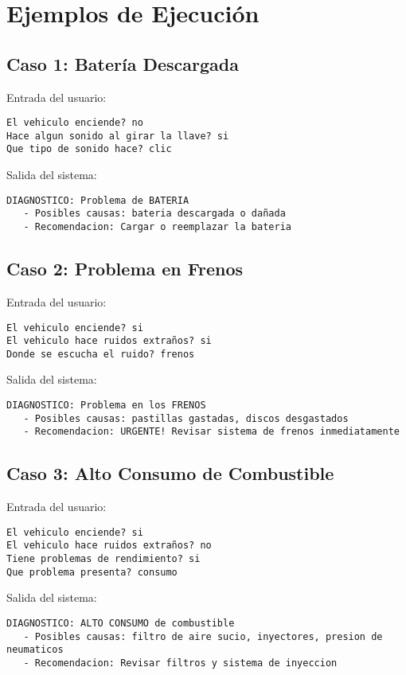 \documentclass[12pt]{article}
\begin{document}
\newpage

\section{Ejemplos de Ejecución}

\subsection{Caso 1: Batería Descargada}

Entrada del usuario:
\begin{verbatim}
El vehiculo enciende? no
Hace algun sonido al girar la llave? si
Que tipo de sonido hace? clic
\end{verbatim}

Salida del sistema:
\begin{verbatim}
DIAGNOSTICO: Problema de BATERIA
   - Posibles causas: bateria descargada o dañada
   - Recomendacion: Cargar o reemplazar la bateria
\end{verbatim}

\subsection{Caso 2: Problema en Frenos}

Entrada del usuario:
\begin{verbatim}
El vehiculo enciende? si
El vehiculo hace ruidos extraños? si
Donde se escucha el ruido? frenos
\end{verbatim}

Salida del sistema:
\begin{verbatim}
DIAGNOSTICO: Problema en los FRENOS
   - Posibles causas: pastillas gastadas, discos desgastados
   - Recomendacion: URGENTE! Revisar sistema de frenos inmediatamente
\end{verbatim}

\subsection{Caso 3: Alto Consumo de Combustible}

Entrada del usuario:
\begin{verbatim}
El vehiculo enciende? si
El vehiculo hace ruidos extraños? no
Tiene problemas de rendimiento? si
Que problema presenta? consumo
\end{verbatim}

Salida del sistema:
\begin{verbatim}
DIAGNOSTICO: ALTO CONSUMO de combustible
   - Posibles causas: filtro de aire sucio, inyectores, presion de neumaticos
   - Recomendacion: Revisar filtros y sistema de inyeccion
\end{verbatim}
\end{document}
